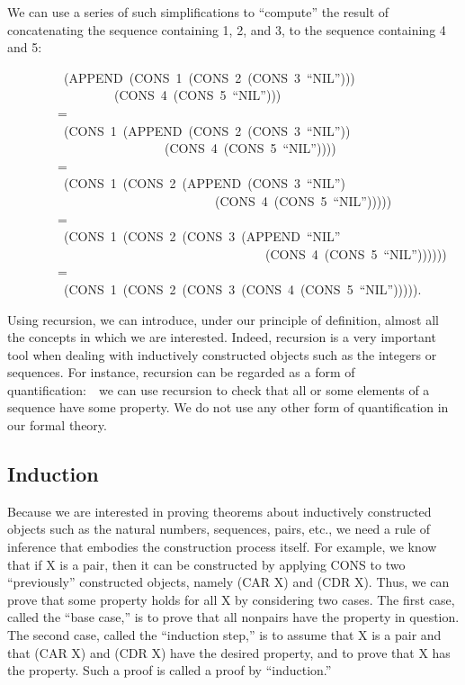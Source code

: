 \documentclass[11pt]{book}
\newenvironment{pubasis}{\begin{flushleft}\ttfamily\small}{\normalsize\rmfamily\end{flushleft}}
\newcommand{\pubdefaulttextsize}{\large}
\begin{document}
We can use a series of such simplifications to ``compute'' the result
of concatenating the sequence containing 1, 2, and 3, to the
sequence containing 4 and 5:
\begin{pubasis}
~~~~~~~~~(APPEND~(CONS~1~(CONS~2~(CONS~3~``NIL'')))\\
~~~~~~~~~~~~~~~~~(CONS~4~(CONS~5~``NIL'')))\\
~~~~~~~~=\\
~~~~~~~~~(CONS~1~(APPEND~(CONS~2~(CONS~3~``NIL''))\\
~~~~~~~~~~~~~~~~~~~~~~~~~(CONS~4~(CONS~5~``NIL''))))\\
~~~~~~~~=\\
~~~~~~~~~(CONS~1~(CONS~2~(APPEND~(CONS~3~``NIL'')\\
~~~~~~~~~~~~~~~~~~~~~~~~~~~~~~~~~(CONS~4~(CONS~5~``NIL'')))))\\
~~~~~~~~=\\
~~~~~~~~~(CONS~1~(CONS~2~(CONS~3~(APPEND~``NIL''\\
~~~~~~~~~~~~~~~~~~~~~~~~~~~~~~~~~~~~~~~~~(CONS~4~(CONS~5~``NIL''))))))\\
~~~~~~~~=\\
~~~~~~~~~(CONS~1~(CONS~2~(CONS~3~(CONS~4~(CONS~5~``NIL''))))).\\
\end{pubasis}
Using recursion, we can introduce, under our principle of definition,
almost all the concepts in which we are interested.  Indeed, recursion is
a very important tool when dealing with inductively constructed objects
such as the integers or sequences.  For instance, recursion can be regarded
as a form of quantification:~~we can use recursion to check that all or
some elements of a sequence have some property.
We do not use any
other form of quantification in our formal theory.
\subsection{Induction}
\pubdefaulttextsize
Because we are interested in proving theorems about inductively constructed
objects such as the natural numbers, sequences, pairs, etc.,
we need a rule of inference that embodies the construction
process itself.  For example, we know that if X is a pair, then it can be constructed
by applying CONS to two ``previously'' constructed objects, namely (CAR X) and (CDR X).
Thus,  we can prove that some property
holds for all X by considering two cases.  The first case, called the
``base case,'' is to prove that all nonpairs have the property in question.
The second case, called the ``induction step,'' is to assume that X is
a pair and that (CAR X) and (CDR X) have the desired property, and
to prove that X has the property.  Such a proof is called a proof by ``induction.''
\end{document}

